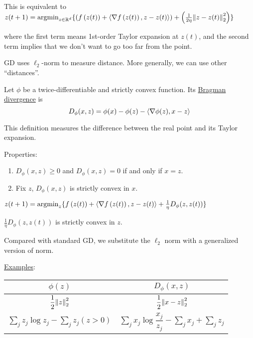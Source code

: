 This is equivalent to \( z(t+1) = \text{argmin}_{z \in \mathbb{R}^d} \{  \left(f\left(z(t)\right)
+ \langle \nabla f \left( z(t) \right), z - z(t) \rangle\right) + \left(\frac{1}{2\eta} 
\norm{z - z(t)}_2^2\right)   \}\)

where the first term means 1st-order Taylor expansion at \(z(t)\), and the second term implies that 
we don't want to go too far from the point. 

GD uses \(\ell_2\)-norm to measure distance. More generally, we can use other ``distances''. 

\begin{definition}
    Let \(\phi\) be a twice-differentiable and strictly convex function. Its \underline{Bragman divergence}
    is 
    \[
        D_\phi (x, z) = \phi (x) - \phi (z) - \langle \nabla \phi (z),  x - z \rangle  
    \]
\end{definition}

\begin{remark}
    This definition measures the difference between the real point and its Taylor expansion. 
\end{remark}

Properties: 
\begin{enumerate}[label=\textcircled{\small\arabic*}]
    \item \(D_\phi (x, z) \geq 0\) and \(D_\phi (x, z) = 0\) if and only if \(x = z\). 
    \item Fix \(z\), \(D_\phi (x, z)\) is strictly convex in \(x\). 
  \end{enumerate}

\begin{definition}
    \(z(t + 1) = \text{argmin}_z \{  f\left(z(t)\right) + \langle \nabla f\left(z(t)\right), z - z(t) \rangle
    + \frac{1}{\eta} D_\phi (z, z(t)) \}\)
\end{definition}

\begin{remark}
    \(\frac{1}{\eta} D_\phi (z, z(t)) \) is strictly convex in \(z\). 

    Compared with standard GD, we substitute the \(\ell_2\) norm with a generalized version 
    of norm. 
\end{remark}

\underline{Examples}: 

\begin{tabular}{|c|c|}
    \hline
    $\phi(z)$ & $D_\phi (x, z)$ \\
    \hline
    $\dfrac{1}{2} \norm{z}_2^2$ & $\dfrac{1}{2} \norm{x - z}_2^2$ \\
    \hline
    $\sum_j z_j \log z_j - \sum_j z_j (z > 0)$ & $\sum_j x_j \log \dfrac{x_j}{z_j} - \sum_j x_j + \sum_j z_j$ \\
    \hline
  \end{tabular}

